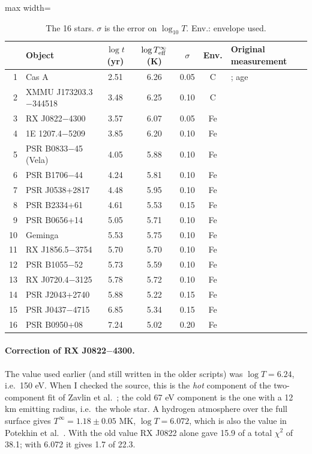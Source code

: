 \documentclass[11pt,a4paper]{article}
\begin{document}
\begin{table}[h]
\centering
\small
\caption{The 16 stars. $\sigma$ is the error on $\log_{10}T$. Env.: envelope used.}\label{tab:obs}
\begin{adjustbox}{max width=\linewidth}
\begin{tabular}{rlccccl}
\toprule
 & Object & $\log t$ (yr) & $\log T_{\rm eff}^\infty$ (K) & $\sigma$ & Env. & Original measurement\\
\midrule
1 & Cas A & 2.51 & 6.26 & 0.05 & C & \cite{HoHeinke2009}; age \cite{Fesen2006}\\
2 & XMMU J173203.3$-$344518 & 3.48 & 6.25 & 0.10 & C & \cite{Klochkov2013}\\
3 & RX J0822$-$4300 & 3.57 & 6.07 & 0.05 & Fe & \cite{Zavlin1999,Becker2012}\\
4 & 1E 1207.4$-$5209 & 3.85 & 6.20 & 0.10 & Fe & \cite{DeLuca2004}\\
5 & PSR B0833$-$45 (Vela) & 4.05 & 5.88 & 0.10 & Fe & \cite{Pavlov2001}\\
6 & PSR B1706$-$44 & 4.24 & 5.81 & 0.10 & Fe & \cite{McGowan2004}\\
7 & PSR J0538+2817 & 4.48 & 5.95 & 0.10 & Fe & \cite{Ng2007}\\
8 & PSR B2334+61 & 4.61 & 5.53 & 0.15 & Fe & \cite{McGowan2006}\\
9 & PSR B0656+14 & 5.05 & 5.71 & 0.10 & Fe & \cite{DeLuca2005}\\
10 & Geminga & 5.53 & 5.75 & 0.10 & Fe & \cite{DeLuca2005}\\
11 & RX J1856.5$-$3754 & 5.70 & 5.70 & 0.10 & Fe & \cite{Ho2007}\\
12 & PSR B1055$-$52 & 5.73 & 5.59 & 0.10 & Fe & \cite{DeLuca2005}\\
13 & RX J0720.4$-$3125 & 5.78 & 5.72 & 0.10 & Fe & \cite{Motch2003}\\
14 & PSR J2043+2740 & 5.88 & 5.22 & 0.15 & Fe & \cite{Becker2004}\\
15 & PSR J0437$-$4715 & 6.85 & 5.34 & 0.15 & Fe & \cite{Durant2012}\\
16 & PSR B0950+08 & 7.24 & 5.02 & 0.20 & Fe & \cite{Pavlov2017}\\
\bottomrule
\end{tabular}
\end{adjustbox}
\end{table}

\paragraph{Correction of RX J0822$-$4300.} The value used earlier (and still written in the older scripts) was $\log T=6.24$, i.e.\ 150 eV. When I checked the source, this is the \emph{hot} component of the two-component fit of Zavlin et al.\ \cite{Zavlin1999}; the cold 67 eV component is the one with a 12 km emitting radius, i.e.\ the whole star. A hydrogen atmosphere over the full surface gives $T^\infty=1.18\pm0.05$ MK, $\log T=6.072$, which is also the value in Potekhin et al.\ \cite{Potekhin2020}. With the old value RX J0822 alone gave 15.9 of a total $\chi^2$ of 38.1; with 6.072 it gives 1.7 of 22.3.
\end{document}
